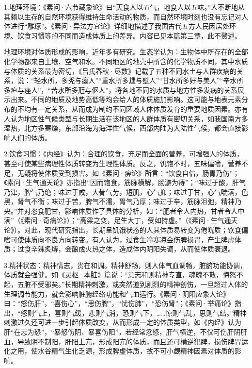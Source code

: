 \documentclass[draft,12pt]{ctexbook}
\begin{document}
1.地理环境：《素问·六节藏象论》曰“天食人以五气，地食人以五味。”人不断地从其赖以生存的自然环境获得维持生命活动的物质，而自然环境时刻也没有忘记对人体进行“雕琢”。《素问·异法方宜论》详细地描述了我国古代五方人民因居处环境、饮食习惯等的不同而造成体质上的差异。内容已见本篇第三章，此不赘述。

地理环境对体质形成的影响，近年多有研究。生态学认为：生物体中所存在的全部化学物都来自土壤、空气和水。不同地区的地壳中所含的化学物质不同，其中水质与体质的关系最为密切，《吕氏春秋·尽数》记载了五种不同水土与人群疾病的关系，说：“轻水所，多秃与瘿人”“重水所多尰与躄人”“甘水所多好与美人”“辛水所多疸与痤人”，“苦水所多尫与伛人”，将各地不同的水质与地方性多发病的关系展示出来。不同的地质及地势高低等均会给人的体质施加影响。这可能与地表元素分布的不均有一定关系，从而成为制约不同区域人体体质发育的重要地质因素。亦有人认为地区性气候类型与长期生活在该地区的人群体质有密切关系，如我国南方多湿热，北方多寒燥，东部沿海为海洋性气候，西部内陆为大陆性气候，都会直接影响人们的体质。

2.饮食习惯：《内经》认为：合理的饮食，充足而全面的营养，可增强人的体质，甚至可使某些病理性体质转变为生理性体质。反之，饥饱不时，五味偏嗜，营养不足，无疑将使体质受到损害。如《素问·痹论》所言：“饮食自倍，肠胃乃伤”；《素问·生气通天论》亦指出“因而饱食，筋脉横解，肠澼为痔”；“味过于酸，肝气乃津，脾气乃绝；味过于咸，大骨气劳，短肌，心气抑；味过于甘，心气喘满，色黑，肾气不衡；味过于苦，脾气不濡，胃气乃厚；味过于辛，筋脉沮弛，精神乃央。”并对恣食肥甘，影响体质作了具体的分析，如：“肥者令人内热，甘者令人中满”（《素问·奇病论》）；“高梁之变，足生大丁，受如持虚。”（《素问·生气通天论》）。对此，现代研究指出，长期呈饥饿状态的人其体质易转变为倦㿠质；饮食偏嗜可使体质向不良方向转变。有人认为，过食生冷寒凉会伤脾损胃，产生脾虚体质；过食辛辣炙煿，会酿成火热之体，造成体内阴阳失调，从而使体质衰退。

3.精神状态：精神情志，贵在和调。精神舒畅，则人体气血调畅，脏腑功能协调，体质就会强健。如《灵枢·本脏》篇说：“意志和则精神专直，魂魄不散，悔怒不起，五脏不受邪矣。”长期精神刺激，或突然道到剧烈的精神创伤，一旦超过人体的生理调节能力，就会影响脏腑经络功能和气血运行。《素问·阴阳应象大论》曰：“怒伤肝”，“喜伤心”，“思伤脾”，“忧伤肺”，“恐伤肾”；《素问·举痛论》指出，“怒则气上，喜则气缓，悲则气消，恐则气下，……惊则气乱，思则气结。”精神刺激过久还可进一步引起体质改变，从而形成一定的体质类型，如《内经》认为肝“在志为怒”，“暴怒伤阴、暴喜伤阳”，若经常忿怒，肝气横逆，不仅可伤肝阴肝血，导致阴不制阳，肝阳上亢，形成阳亢的体质，而且还可横逆犯脾，损伤脾胃运化之用，使水谷精气生化乏源，形成脾虚体质，故不可小觑精神因素对体质的影响。
\end{document}
